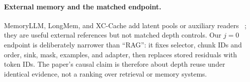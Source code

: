 \paragraph{External memory and the matched endpoint.}
MemoryLLM, LongMem, and XC-Cache add latent pools or auxiliary readers
~\citep{memoryllm,longmem,xccache}; they are useful external references but not
matched depth controls. Our $j{=}0$ endpoint is deliberately narrower than
``RAG'': it fixes selector, chunk IDs and order, sink, mask, examples, and
adapter, then replaces stored residuals with token IDs. The paper's causal claim
is therefore about depth reuse under identical evidence, not a ranking over
retrieval or memory systems.
